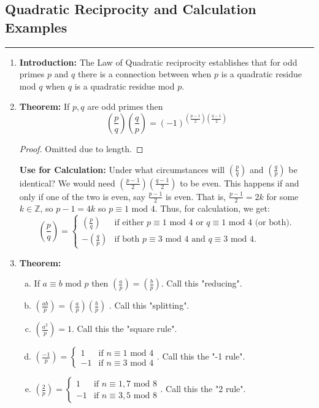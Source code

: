 \documentclass[class=article, crop=false]{standalone}
\def\integers{{\mathbb Z}}
\begin{document}
\subsection{Quadratic Reciprocity and Calculation Examples}
\rule{\textwidth}{1pt}
\begin{enumerate}
	\item \textbf{Introduction:}
	The Law of Quadratic reciprocity establishes that for odd primes $p$ and $q$
	there is a connection between when $p$ is a quadratic residue mod $q$ when
	$q$ is a quadratic residue mod $p$.
	
	\item \textbf{Theorem:}
	If $p,q$ are odd primes then
	$$\left(\frac{p}{q}\right)\left(\frac{q}{p}\right) = (-1)^{\left(\frac{p-1}{2}\right)\left(\frac{q-1}{2}\right)}$$
	\begin{proof}
		Omitted due to length.
	\end{proof}

	\noindent\textbf{Use for Calculation:} Under what circumstances will $\left(\frac{p}{q}\right)$ and
	$\left(\frac{q}{p}\right)$ be identical? We would need $\left(\frac{p-1}{2}\right)\left(\frac{q-1}{2}\right)$
	to be even. This happens if and only if one of the two is even, say $\frac{p-1}{2}$ is even.
	That is, $\frac{p-1}{2} = 2k$ for some $k\in\integers$, so $p-1=4k$ so $p\equiv 1\mbox{ mod }4$.
	Thus, for calculation, we get:
	$$\left(\frac{p}{q}\right) = \begin{cases}
		\left(\frac{p}{q}\right) &\text{if either $p\equiv1$ mod 4 or $q\equiv 1\mbox{ mod } 4$ (or both).} \\
		-\left(\frac{q}{p}\right) &\text{if both $p\equiv 3\mbox{ mod }4$ and $q\equiv 3\mbox{ mod } 4$.}
	\end{cases}$$

	\item \textbf{Theorem:}
	\begin{enumerate}[(a)]
		\item If $a\equiv b\mbox{ mod }p$ then $\left(\frac{a}{p}\right)=\left(\frac{b}{p}\right)$. Call this "reducing".
		\item $\left(\frac{ab}{p}\right) = \left(\frac{a}{p}\right) \left(\frac{b}{p}\right)$ . Call this "splitting".
		\item $\left(\frac{a^2}{p}\right) = 1$. Call this the "square rule".
		\item $\left(\frac{-1}{p}\right) = \begin{cases}
			1 &\text{if $n\equiv 1\mbox{ mod } 4$}\\
			-1 &\text{if $n\equiv 3\mbox{ mod } 4$}
		\end{cases}$. Call this the "-1 rule".
		\item $\left(\frac{2}{p}\right) = \begin{cases}
			1 &\text{if $n\equiv 1,7\mbox{ mod } 8$}\\
			-1 &\text{if $n\equiv 3,5\mbox{ mod } 8$}\end{cases}$. Call this the "2 rule".
	\end{enumerate}


\end{enumerate}
\end{document}

